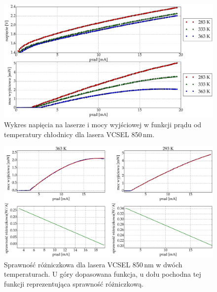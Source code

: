 \begin{figure}
\center
  \includegraphics[scale=0.30]{plot_vcsel_850/plot_power_voltage.eps}
  \caption{Wykres napięcia na laserze i mocy wyjściowej w funkcji prądu od temperatury chłodnicy dla lasera VCSEL 850\,nm.}
  \label{fig:plot_power_voltage_vcsel850}
\end{figure}
\begin{figure}
\center
  \includegraphics[scale=0.30]{plot_vcsel_850/plot_eff_all_via_current2.eps}
  \caption{Sprawność różniczkowa dla lasera VCSEL 850\,nm w dwóch temperaturach. U góry dopasowana funkcja,
u dołu pochodna tej funkcji reprezentująca sprawność różniczkową.}
  \label{fig:plot_eff_all_via_current2_vcsel850}
\end{figure}
